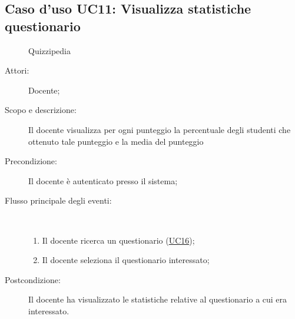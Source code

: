 \subsection{Caso d'uso UC11: Visualizza statistiche questionario}
	\begin{figure}[H]
		\centering
		\begin{resizedtikzpicture}{\textwidth}
		\begin{umlsystem}[x=0, fill=lightgray!20]{Quizzipedia}
		\end{umlsystem}
		\end{resizedtikzpicture}
		\caption{}
	\end{figure}
\begin{description}
\item[Attori:] Docente;
\item[Scopo e descrizione:] Il docente visualizza per ogni punteggio la percentuale degli studenti che ottenuto tale punteggio e la media del punteggio
      \item[Precondizione:] Il docente è autenticato presso il sistema;

        \item[Flusso principale degli eventi:] \ 
 \begin{enumerate}
          \item Il docente ricerca un questionario (\hyperlink{UC16}{UC16});
          \item Il docente seleziona il questionario interessato;

      \end{enumerate}
    \item[Postcondizione:] Il docente ha visualizzato le statistiche relative al questionario a cui era interessato.
  \end{description}
\hypertarget{UC12}{}
